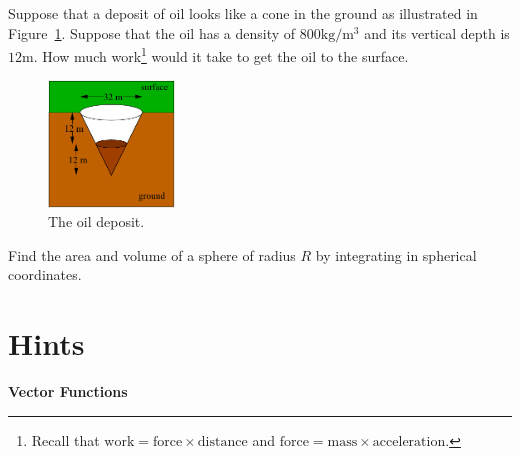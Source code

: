 \begin{Exercise}
  \label{exercise oil work}
  Suppose that a deposit of oil looks like a cone in the ground as 
  illustrated in Figure~\ref{figure oil work}.  Suppose that the oil has 
  a density of $800 \mathrm{kg} / \mathrm{m}^3$ and its vertical depth
  is $12 \mathrm{m}$.  How much work\footnote{
    Recall that $\mathrm{work} = \mathrm{force} \times \mathrm{distance}$
    and $\mathrm{force} = \mathrm{mass} \times \mathrm{acceleration}$. }
  would it take to get the oil to the surface.
  \begin{figure}[h!]
    \begin{center}
      \includegraphics[width=0.3\textwidth]{calculus/vector/oilwork}
    \end{center}
    \caption{The oil deposit.}
    \label{figure oil work}
  \end{figure}

\end{Exercise}








\begin{Exercise}
  \label{exercise area volume sphere}
  Find the area and volume of a sphere of radius $R$ by integrating in 
  spherical coordinates.

\end{Exercise}






\raggedbottom
\pagebreak
\flushbottom
\section{Hints}






\begin{large}
  \noindent
  \textbf{Vector Functions}
\end{large}



